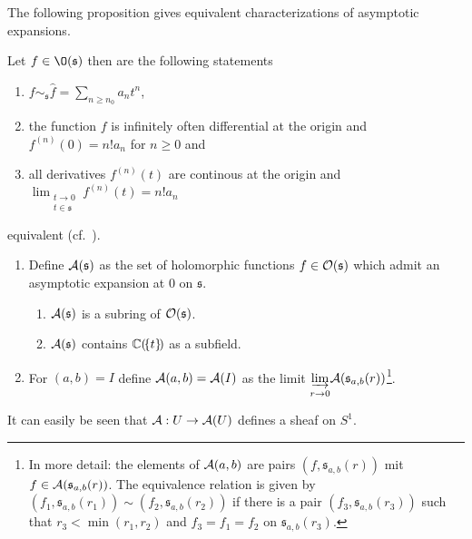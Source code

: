 The following proposition gives equivalent characterizations of asymptotic
expansions.
\begin{prop}
  Let $f\in\O(\mathfrak{s})$ then are the following statements
  \begin{enumerate}
  \item $f\sim_{\mathfrak{s}}\hat f=\sum_{n\geq n_0}a_nt^n$,
  \item the function $f$ is infinitely often differential at the origin and
    $f^{(n)}(0)=n!a_n$ for $n\geq0$ and
  \item all derivatives $f^{(n)}(t)$ are continous at the origin and
    $\lim_{\substack{t\to0\\t\in\mathfrak{s}}}f^{(n)}(t)=n!a_n$
  \end{enumerate}
  equivalent (cf.~\cite[4.4.Prop.8]{Balser2000Formal}).
\end{prop}

\begin{defn}
  \begin{enumerate}
    \item Define $\mathcal{A}(\mathfrak{s})$ as the set of holomorphic functions
      $f\in\mathcal{O}(\mathfrak{s})$ which admit an asymptotic expansion at $0$ on
      $\mathfrak{s}$.
      \begin{s-rem}
        \begin{enumerate}
          \item
            $\mathcal{A}(\mathfrak{s})$ is a subring of $\mathcal{O}(\mathfrak{s})$.
          \item
            $\mathcal{A}(\mathfrak{s})$ contains $\mathbb{C}(\!\{t\}\!)$ as a subfield.
        \end{enumerate}
      \end{s-rem}
    \item
      For $(a,b)=I$ define $\mathcal{A}(a,b)=\mathcal{A}(I)$ as the limit
      $\underset{r\to0}{\underrightarrow{\lim}}
      \mathcal{A}(\mathfrak{s}_{a,b}(r))$\footnote{In more detail: the
        elements of $\mathcal{A}(a,b)$ are pairs $(f,\mathfrak{s}_{a,b}(r))$ mit
        $f\in\mathcal{A}(\mathfrak{s}_{a,b}(r))$. The equivalence relation is given by
        $(f_1,\mathfrak{s}_{a,b}(r_1))\sim(f_2,\mathfrak{s}_{a,b}(r_2))$ if
      there is a pair $(f_3,\mathfrak{s}_{a,b}(r_3))$ such that
      $r_3<\min(r_1,r_2)$ and $f_3=f_1=f_2$ on $\mathfrak{s}_{a,b}(r_3)$.}.
  \end{enumerate}
\end{defn}
It can easily be seen that $\mathcal{A}:U\to\mathcal{A}(U)$ defines a sheaf on $S^1$.


